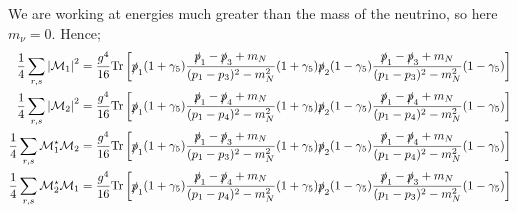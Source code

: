 \documentclass[10pt]{article}
\begin{document}
We are working at energies much greater than the mass of the neutrino, so here $m_\nu = 0$. Hence;
\begin{align*}
\frac{1}{4}\sum_{r, s}{\left|\mathcal{M}_1\right|^2 }&= \frac{g^4}{16}\text{Tr}\left[\slashed{p}_1(1 + \gamma_5)\frac{\slashed{p}_1 - \slashed{p}_3 + m_N}{(p_1 - p_3)^2 - m_N^2}(1 + \gamma_5)\slashed{p}_2(1 - \gamma_5)\frac{\slashed{p}_1 - \slashed{p}_3 + m_N}{(p_1 - p_3)^2 - m_N^2}(1 - \gamma_5) \right] \\
\frac{1}{4}\sum_{r, s}{\left|\mathcal{M}_2\right|^2 }&= \frac{g^4}{16}\text{Tr}\left[\slashed{p}_1(1 + \gamma_5)\frac{\slashed{p}_1 - \slashed{p}_4 + m_N}{(p_1 - p_4)^2 - m_N^2}(1 + \gamma_5)\slashed{p}_2(1 - \gamma_5)\frac{\slashed{p}_1 - \slashed{p}_4 + m_N}{(p_1 - p_4)^2 - m_N^2}(1 - \gamma_5) \right] \\
\frac{1}{4}\sum_{r, s}{\mathcal{M}_1^\star \mathcal{M}_2}&= \frac{g^4}{16}\text{Tr}\left[\slashed{p}_1(1 + \gamma_5)\frac{\slashed{p}_1 - \slashed{p}_3 + m_N}{(p_1 - p_3)^2 - m_N^2}(1 + \gamma_5)\slashed{p}_2(1 - \gamma_5)\frac{\slashed{p}_1 - \slashed{p}_4 + m_N}{(p_1 - p_4)^2 - m_N^2}(1 - \gamma_5) \right] \\
\frac{1}{4}\sum_{r, s}{\mathcal{M}_2^\star \mathcal{M}_1}&= \frac{g^4}{16}\text{Tr}\left[\slashed{p}_1(1 + \gamma_5)\frac{\slashed{p}_1 - \slashed{p}_4 + m_N}{(p_1 - p_4)^2 - m_N^2}(1 + \gamma_5)\slashed{p}_2(1 - \gamma_5)\frac{\slashed{p}_1 - \slashed{p}_3 + m_N}{(p_1 - p_3)^2 - m_N^2}(1 - \gamma_5) \right] \\
\end{align*}
\end{document}
